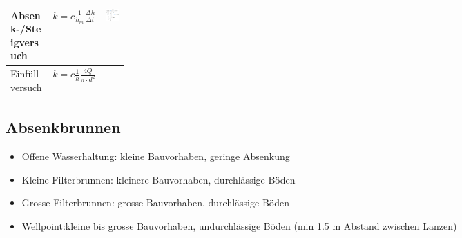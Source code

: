 \begin{landscape}
\begin{minipage}{\linewidth}
\begin{tabular}{l|l|p{0.2\linewidth}}
		Absenk-/Steigversuch & $ k = c \frac{1}{h_m} \frac{\Delta h}{\Delta
		 t} $	& \smallskip \includegraphics[width=\linewidth]{images/GW8Absenk.PNG}  \\ \hline
		
		Einfüllversuch & $ k = c \frac{1}{h} \frac{4Q}{\pi \cdot d^2} $  &\\
		
	\end{tabular}
\end{minipage}




\begin{minipage}{0.6\linewidth}
\subsection{Absenkbrunnen}
	
	\begin{itemize}
		\item Offene Wasserhaltung: kleine Bauvorhaben, geringe Absenkung
		\item Kleine Filterbrunnen: kleinere Bauvorhaben, durchlässige Böden
		\item Grosse Filterbrunnen: grosse Bauvorhaben, durchlässige Böden
		\item Wellpoint:kleine bis grosse Bauvorhaben, undurchlässige Böden (min 1.5 m Abstand zwischen Lanzen)
		

\end{itemize}
\end{minipage}
\end{landscape}
